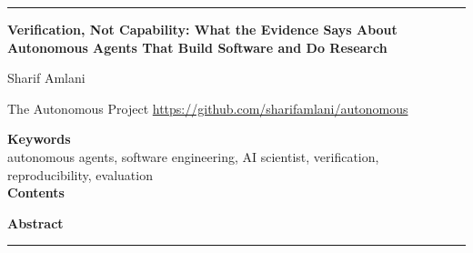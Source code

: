\documentclass[10pt,letterpaper]{article}
\begin{document}
\thispagestyle{plain}
\par
\noindent\textcolor{arblue}{\rule{\dimexpr\linewidth+1.55in}{1.2pt}}\par\vspace{10pt}
\noindent\begin{minipage}{\dimexpr\linewidth+1.55in}
\raggedright
{\LARGE\bfseries\color{arblue} Verification, Not Capability: What the Evidence Says About Autonomous Agents That Build Software and Do Research\par}
\vspace{10pt}
{\large Sharif Amlani\par}
\vspace{2pt}
{\small\color{argray} The Autonomous Project \textperiodcentered{} \url{https://github.com/sharifamlani/autonomous}\par}
\end{minipage}
\vspace{12pt}

\noindent\begin{minipage}[t]{0.24\dimexpr\linewidth+1.55in}
\small\raggedright
\textcolor{arblue}{\textbf{Keywords}}\\[2pt]
autonomous agents, software engineering, AI scientist, verification, reproducibility, evaluation\\[10pt]
\textcolor{arblue}{\textbf{Contents}}\\[2pt]

\end{minipage}\hspace{0.06\dimexpr\linewidth+1.55in}%
\begin{minipage}[t]{0.70\dimexpr\linewidth+1.55in}
\setlength{\parindent}{1.2em}\small\noindent
\textcolor{arblue}{\textbf{Abstract}}\\[2pt]

\end{minipage}
\vspace{14pt}

\noindent\textcolor{arblue}{\rule{\dimexpr\linewidth+1.55in}{0.4pt}}
\vspace{6pt}





















\end{document}
